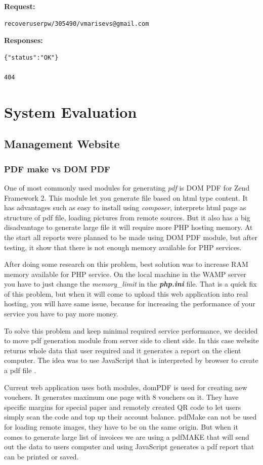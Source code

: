 \textbf{Request:}
\begin{verbatim}
recoveruserpw/305490/vmarisevs@gmail.com
\end{verbatim}

\textbf{Responses:}
\begin{verbatim}
{"status":"OK"}

404
\end{verbatim}

\chapter{System Evaluation}	%
\section{Management Website}
	\subsection{PDF make vs DOM PDF}
		One of most commonly used modules for generating \textit{pdf} is DOM PDF for Zend Framework 2. This module let you generate file based on html type content. It has advantages such as easy to install using \textit{composer}, interprets html page as structure of pdf file, loading pictures from remote sources. But it also has a big disadvantage to generate large file it will require more PHP hosting memory. 
		At the start all reports were planned to be made using DOM PDF module, but after testing, it show that there is not enough memory available for PHP services. 
		
		After doing some research on this problem, best solution was to increase RAM memory available for PHP service. On the local machine in the WAMP server you have to just change the \textit{memory\_limit} in the \textit{\textbf{php.ini}} file. That is a quick fix of this problem, but when it will come to upload this web application into real hosting, you will have same issue, because for increasing the  performance of your service you have to pay more money.
		
		To solve this problem and keep minimal required service performance, we decided to move pdf generation module from server side to client side. In this case website returns whole data that user required and it generates a report on the client computer. The idea was to use JavaScript that is interpreted by browser to create a pdf file \cite{PDF_Make_module}.
		
		Current web application uses both modules, domPDF is used for creating new vouchers. It generates maximum one page with 8 vouchers on it. They have specific margins for special paper and remotely created QR code to let users simply scan the code and top up their account balance. pdfMake can not be used for loading remote images, they have to be on the same origin. But when it comes to generate large list of invoices we are using a pdfMAKE that will send out the data to users computer and using JavaScript generates a pdf report that can be printed or saved.
	
